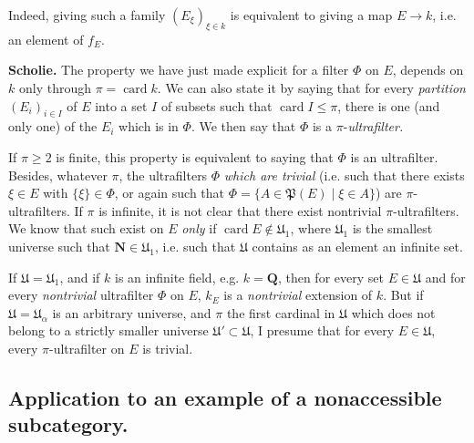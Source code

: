 Indeed, giving such a family $(E_\xi)_{\xi\in k}$ is equivalent to giving a map $E\longrightarrow k$, i.e. an element of $f_E$. %

\textbf{Scholie.} The property we have just made explicit for a filter $\Phi$ on $E$, depends on $k$ only through $\pi=\operatorname{card}k$. We can also state it by saying that for every \textit{partition} $(E_i)_{i\in I}$ of $E$ into a set $I$ of subsets such that $\operatorname{card}I\leqslant\pi$, there is one (and only one) of the $E_i$ which is in $\Phi$. We then say that $\Phi$ is a $\pi$-\textit{ultrafilter.}

If $\pi\geqslant 2$ is finite, this property is equivalent to saying that $\Phi$ is an ultrafilter. Besides, whatever $\pi$, the ultrafilters $\Phi$ \textit{which are trivial} (i.e. such that there exists $\xi\in E$ with $\{\xi\}\in\Phi$, or again such that $\Phi=\{A\in\mathfrak{P}(E)\mid\xi\in A\}$) are $\pi$-ultrafilters. If $\pi$ is infinite, it is not clear that there exist nontrivial $\pi$-ultrafilters. We know that such exist on $E$ \textit{only} if $\operatorname{card}E\notin\mathfrak{U}_1$, where $\mathfrak{U}_1$ is the smallest universe such that $\mathbf{N}\in\mathfrak{U}_1$, i.e. such
that $\mathfrak{U}$ contains as an element an infinite set.

If $\mathfrak{U}=\mathfrak{U}_1$, and if $k$ is an infinite field, e.g. $k=\mathbf{Q}$, then for every set $E\in\mathfrak{U}$ and for every \textit{nontrivial} ultrafilter $\Phi$ on $E$, $k_E$ is a \textit{nontrivial} extension of $k$. But if $\mathfrak{U}=\mathfrak{U}_\alpha$ is an arbitrary universe, and $\pi$ the first cardinal in $\mathfrak{U}$ which does not belong to a strictly smaller universe $\mathfrak{U}'\subset\mathfrak{U}$, I presume that for every $E\in\mathfrak{U}$, every $\pi$-ultrafilter on $E$ is trivial. %


\subsection*{Application to an example of a nonaccessible subcategory.}

